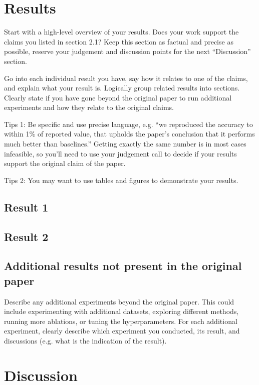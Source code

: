 \documentclass[11pt,a4paper]{article}
\begin{document}
\section{Results}
Start with a high-level overview of your results. Does your work support the claims you listed in section 2.1? Keep this section as factual and precise as possible, reserve your judgement and discussion points for the next ``Discussion'' section. 

Go into each individual result you have, say how it relates to one of the claims, and explain what your result is. Logically group related results into sections. Clearly state if you have gone beyond the original paper to run additional experiments and how they relate to the original claims. 

Tips 1: Be specific and use precise language, e.g. ``we reproduced the accuracy to within 1\% of reported value, that upholds the paper's conclusion that it performs much better than baselines.'' Getting exactly the same number is in most cases infeasible, so you'll need to use your judgement call to decide if your results support the original claim of the paper. 

Tips 2: You may want to use tables and figures to demonstrate your results.


\subsection{Result 1}

\subsection{Result 2}

\subsection{Additional results not present in the original paper}

Describe any additional experiments beyond the original paper. This could include experimenting with additional datasets, exploring different methods, running more ablations, or tuning the hyperparameters. For each additional experiment, clearly describe which experiment you conducted, its result, and discussions (e.g. what is the indication of the result).

\section{Discussion}
\end{document}
